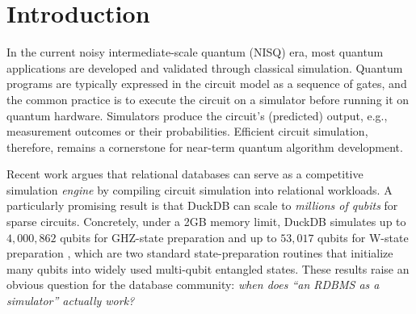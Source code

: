 \section{Introduction}


In the current noisy intermediate-scale quantum (NISQ) era, most quantum applications are developed and validated through classical simulation. Quantum programs are typically expressed in the circuit model as a sequence of gates, and the common practice is to execute the circuit on a simulator before running it on quantum hardware. 
Simulators produce the circuit’s (predicted) output, e.g., measurement outcomes or their probabilities. 
Efficient circuit simulation, therefore, remains a cornerstone for near-term quantum algorithm development. 

\smallskip
{}
    Recent work \cite{einsteinSQL2023, hai2025quantum} argues that relational databases can serve as a competitive simulation \emph{engine} by compiling circuit simulation into relational workloads. A particularly promising result is that DuckDB can scale to \emph{millions of qubits} for sparse circuits. Concretely, under a 2GB memory limit, DuckDB simulates up to $4{,}000{,}862$ qubits for GHZ-state preparation and up to $53{,}017$ qubits for W-state preparation \cite{techreport}, which are two standard state-preparation routines that initialize many qubits into widely used multi-qubit entangled states.  
These results raise an obvious question for the database community: \emph{when does ``an RDBMS as a simulator'' actually work?}

 




